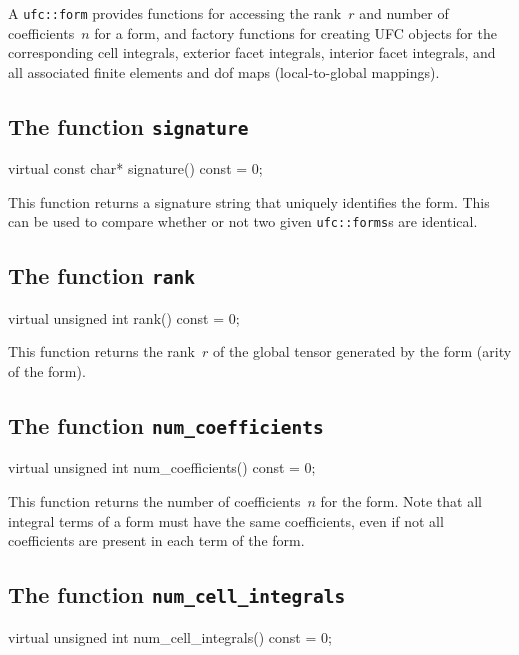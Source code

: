 A \texttt{ufc::form} provides functions for accessing the rank~$r$ and
number of coefficients~$n$ for a form, and factory functions for
creating UFC objects for the corresponding cell integrals, exterior
facet integrals, interior facet integrals, and all associated finite
elements and dof maps (local-to-global mappings).

\subsection{The function \texttt{signature}}

\begin{code}
virtual const char* signature() const = 0;
\end{code}

This function returns a signature string that uniquely identifies the
form. This can be used to compare whether or not two given
\texttt{ufc::forms}s are identical.

\subsection{The function \texttt{rank}}

\begin{code}
virtual unsigned int rank() const = 0;
\end{code}

This function returns the rank~$r$ of the global tensor generated by
the form (arity of the form).

\subsection{The function \texttt{num\_coefficients}}

\begin{code}
virtual unsigned int num_coefficients() const = 0;
\end{code}

This function returns the number of coefficients~$n$ for the form.
Note that all integral terms of a form must have the same
coefficients, even if not all coefficients are present in each term of
the form.

\subsection{The function \texttt{num\_cell\_integrals}}

\begin{code}
virtual unsigned int num_cell_integrals() const = 0;
\end{code}

